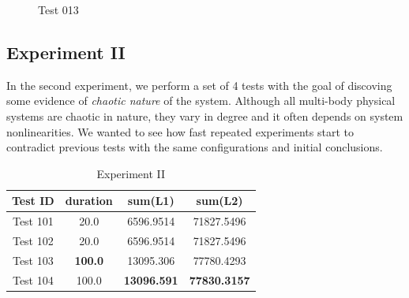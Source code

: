 \documentclass[journal]{IEEEtran}
\begin{document}
\begin{figure}
\centering
{}
\caption{Test 013}
\label{fig:t013}
\end{figure}



\subsection{Experiment II}
In the second experiment, we perform a set of 4 tests with the goal of discoving
some evidence of \emph{chaotic nature} of the system. Although all multi-body
physical systems are chaotic in nature, they vary in degree and it often depends
on system nonlinearities. We wanted to see how fast repeated experiments start
to contradict previous tests with the same configurations and initial conclusions.


\begin{table}[!t]
\renewcommand{\arraystretch}{1.3}
\caption{Experiment II}
\label{tab:002}
\centering
\begin{tabular}{|c||c|c|c|}
\hline
Test ID & duration & sum(L1) & sum(L2) \\
\hline\hline
Test 101 & 20.0  &   6596.9514 & 71827.5496\\
Test 102 & 20.0  &   6596.9514 & 71827.5496\\
Test 103 & \textbf{100.0} &   13095.306 & 77780.4293\\
Test 104 & 100.0 &   \textbf{13096.591} & \textbf{77830.3157}\\
\hline
\end{tabular}
\end{table}
\end{document}
